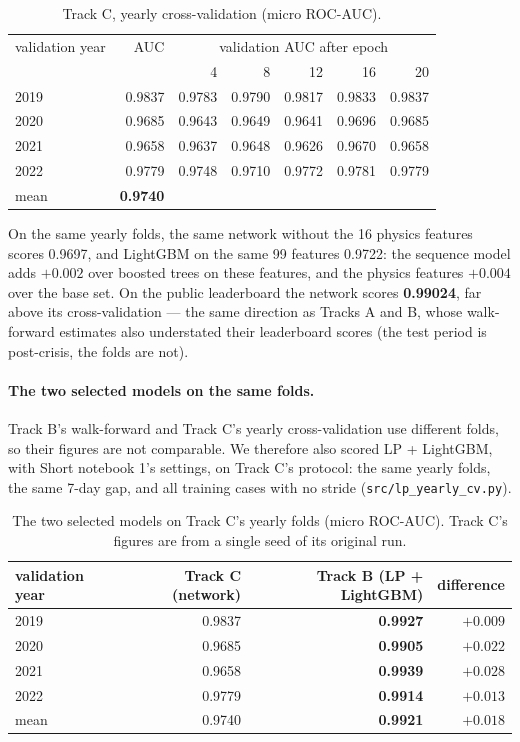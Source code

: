 \documentclass[11pt]{article}
\newcommand{\kagglenn}{0.99024}                        %
\begin{document}
\begin{table}[H]
\centering\small
\begin{tabular}{lrrrrrr}
\toprule
validation year & AUC & \multicolumn{5}{c}{validation AUC after epoch} \\
 & & 4 & 8 & 12 & 16 & 20 \\
\midrule
2019 & 0.9837 & 0.9783 & 0.9790 & 0.9817 & 0.9833 & 0.9837 \\
2020 & 0.9685 & 0.9643 & 0.9649 & 0.9641 & 0.9696 & 0.9685 \\
2021 & 0.9658 & 0.9637 & 0.9648 & 0.9626 & 0.9670 & 0.9658 \\
2022 & 0.9779 & 0.9748 & 0.9710 & 0.9772 & 0.9781 & 0.9779 \\
\midrule
mean & \textbf{0.9740} & & & & & \\
\bottomrule
\end{tabular}
\caption{Track C, yearly cross-validation (micro ROC-AUC).}
\label{tab:r-nn-cv}
\end{table}

On the same yearly folds, the same network without the 16 physics features scores 0.9697, and
LightGBM on the same 99 features 0.9722: the sequence model adds $+0.002$ over boosted trees on these
features, and the physics features $+0.004$ over the base set. On the public leaderboard the network
scores \textbf{\kagglenn{}}, far above its cross-validation --- the same direction as Tracks A and B,
whose walk-forward estimates also understated their leaderboard scores (the test period is
post-crisis, the folds are not).

\paragraph{The two selected models on the same folds.} Track B's walk-forward and Track C's yearly
cross-validation use different folds, so their figures are not comparable. We therefore also scored
LP + LightGBM, with Short notebook 1's settings, on Track C's protocol: the same yearly folds, the same
7-day gap, and all training cases with no stride (\texttt{src/lp\_yearly\_cv.py}).

\begin{table}[H]
\centering\small
\begin{tabular}{lrrr}
\toprule
validation year & Track C (network) & Track B (LP + LightGBM) & difference \\
\midrule
2019 & 0.9837 & \textbf{0.9927} & $+0.009$ \\
2020 & 0.9685 & \textbf{0.9905} & $+0.022$ \\
2021 & 0.9658 & \textbf{0.9939} & $+0.028$ \\
2022 & 0.9779 & \textbf{0.9914} & $+0.013$ \\
\midrule
mean & 0.9740 & \textbf{0.9921} & $+0.018$ \\
\bottomrule
\end{tabular}
\caption{The two selected models on Track C's yearly folds (micro ROC-AUC). Track C's figures are
from a single seed of its original run.}
\label{tab:r-nn-vs-lp}
\end{table}
\end{document}

